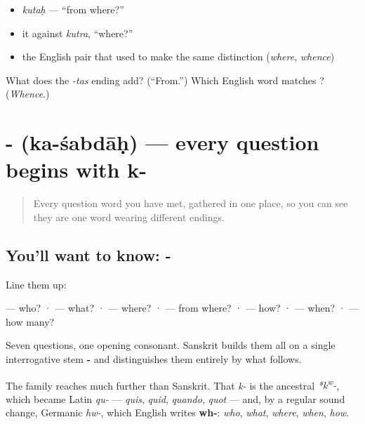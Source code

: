 \begin{itemize}
\raggedright
  \item \emph{kutaḥ} — \textquotedblleft{}from where?\textquotedblright{}
  \item it against \emph{kutra}, \textquotedblleft{}where?\textquotedblright{}
  \item the English pair that used to make the same distinction (\emph{where}, \emph{whence})
\end{itemize}

\begin{tcolorbox}[breakable,colback=teal!4,colframe=teal!35!black,title={Before you move on}]
What does the \emph{-tas} ending add? (\textquotedblleft{}From.\textquotedblright{}) Which English word matches ? (\emph{Whence}.)
\end{tcolorbox}
\section[\texorpdfstring{\sk{क}-\sk{शब्दाः} (ka-śabdāḥ)}{क-शब्दाः (ka-śabdāḥ)}]{- (ka-śabdāḥ) — every question begins with k-}

\label{lesson:SA-C18-k-words}



\begin{quote}
Every question word you have met, gathered in one place, so you can see they are one word wearing different endings.
\end{quote}

\subsection*{You'll want to know: -}
Line them up:

\emph{} — who? · \emph{} — what? · \emph{} — where? · \emph{} — from where? · \emph{} — how? · \emph{} — when? · \emph{} — how many?

Seven questions, one opening consonant. Sanskrit builds them all on a single interrogative stem \textbf{-} and distinguishes them entirely by what follows.

The family reaches much further than Sanskrit. That \emph{k-} is the ancestral \emph{*k\textsuperscript{w}-}, which became Latin \emph{qu-} — \emph{quis}, \emph{quid}, \emph{quando}, \emph{quot} — and, by a regular sound change, Germanic \emph{hw-}, which English writes \textbf{wh-}: \emph{who}, \emph{what}, \emph{where}, \emph{when}, \emph{how}.

